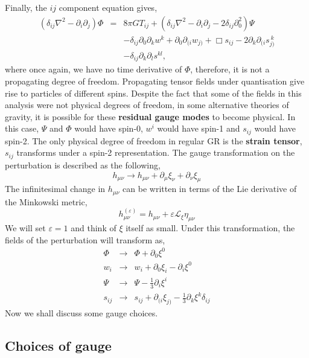 Finally, the $ij$ component equation gives, 
\begin{eqnarray*}
    \left(\delta_{ij}\nabla^2 - \partial_i\partial_j \right)\Phi &=& 8\pi GT_{ij} + (\delta_{ij}\nabla^2 - \partial_i\partial_j - 2\delta_{ij}\partial_0^2)\Psi \\
    &\ & - \delta_{ij}\partial_0\partial_kw^k + \partial_0\partial_{(i}w_{j)} + \Box s_{ij} - 2\partial_k\partial_{(i}s_{j)}^{\ k}\\
    &\ & - \delta_{ij}\partial_k\partial_l s^{kl},
\end{eqnarray*}
where once again, we have no time derivative of $\Phi$, therefore, it is not a propagating degree of freedom. Propagating tensor fields under quantisation give rise to particles of different spins. Despite the fact that some of the fields in this analysis were not physical degrees of freedom, in some alternative theories of gravity, it is possible for these \textbf{residual gauge modes} to become physical. In this case, $\Psi$ and $\Phi$ would have spin-0, $w^i$ would have spin-1 and $s_{ij}$ would have spin-2. The only physical degree of freedom in regular GR is the \textbf{strain tensor}, $s_{ij}$ transforms under a spin-2 representation.
The gauge transformation on the perturbation is described as the following, 
$$h_{\mu\nu}\rightarrow h_{\mu\nu} + \partial_{\mu}\xi_{\nu} + \partial_{\nu}\xi_{\mu}$$
The infinitesimal change in $h_{\mu\nu}$ can be written in terms of the Lie derivative of the Minkowski metric, 
\begin{equation}
    h_{\mu\nu}^{(\varepsilon)} = h_{\mu\nu} + \varepsilon\mathcal{L}_{\xi}\eta_{\mu\nu}
\end{equation}
We will set $\varepsilon=1$ and think of $\xi$ itself as small. Under this transformation, the fields of the perturbation will transform as, 
\begin{eqnarray}
    \Phi &\rightarrow& \Phi + \partial_0\xi^0\\
    w_i &\rightarrow& w_i + \partial_0\xi_i - \partial_{i}\xi^0\label{w-trans}\\
    \Psi &\rightarrow& \Psi - \frac{1}{3}\partial_i\xi^i\\
    s_{ij}&\rightarrow& s_{ij} + \partial_{(i}\xi_{j)} - \frac{1}{3}\partial_k\xi^k \delta_{ij}\label{s-trans}
\end{eqnarray}
Now we shall discuss some gauge choices.
\subsection{Choices of gauge}
